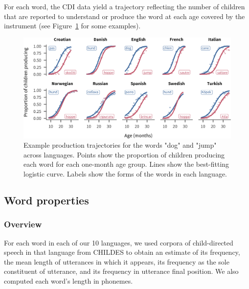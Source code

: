 \documentclass[manuscript]{stjour}
\begin{document}
For each word, the CDI data yield a trajectory reflecting the number of
children that are reported to understand or produce the word at each age
covered by the instrument (see Figure~\ref{fig:demotraj} for some
examples).

\begin{figure}

{\centering \includegraphics[width=\textwidth]{demotraj-1}

}

\caption{Example production trajectories for the words "dog" and "jump" across languages. Points show the proportion of children producing each word for each one-month age group. Lines show the best-fitting logistic curve. Labels show the forms of the words in each language.}\label{fig:demotraj}
\end{figure}

\subsection{Word properties}

\subsubsection{Overview}

For each word in each of our 10 languages, we used corpora of
child-directed speech in that language from CHILDES to obtain an
estimate of its frequency, the mean length of utterances in which it
appears, its frequency as the sole constituent of utterance, and its
frequency in utterance final position. We also computed each word's
length in phonemes.
\end{document}

